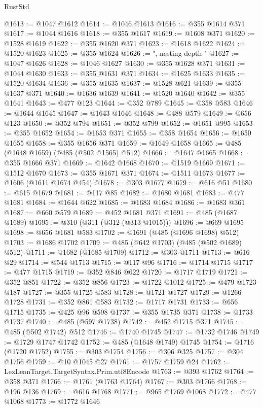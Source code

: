 \begin{lexlean}{RustStd}
\begin{coremodule}
@1613 := @1047 @1612
@1614 := @1046 @1613
@1616 := @355 @1614 @371
@1617 := @1044 @1616
@1618 := @355 @1617
@1619 := @1608 @371
@1620 := @1528 @1619
@1622 := @355 @1620 @371
@1623 := @1618 @1622
@1624 := @1520 @1623
@1625 := @355 @1624
@1626 := ", nesting depth "
@1627 := @1047 @1626
@1628 := @1046 @1627
@1630 := @355 @1628 @371
@1631 := @1044 @1630
@1633 := @355 @1631 @371
@1634 := @1625 @1633
@1635 := @1520 @1634
@1636 := @355 @1635
@1637 := @1528 @621
@1639 := @355 @1637 @371
@1640 := @1636 @1639
@1641 := @1520 @1640
@1642 := @355 @1641
@1643 := @477 @123
@1644 := @352 @789
@1645 := @358 @583
@1646 := @1644 @1645
@1647 := @1643 @1646
@1648 := @488 @579
@1649 := @656 @123
@1650 := @352 @794
@1651 := @352 @799
@1652 := @1651 @995
@1653 := @355 @1652
@1654 := @1653 @371
@1655 := @358 @1654
@1656 := @1650 @1655
@1658 := @355 @1656 @371
@1659 := @1649 @1658
@1665 := @485 (@1648 @1659) (@485 (@502 @1565) @512)
@1666 := @1647 @1665
@1668 := @355 @1666 @371
@1669 := @1642 @1668
@1670 := @1519 @1669
@1671 := @1512 @1670
@1673 := @355 @1671 @371
@1674 := @1511 @1673
@1677 := @1606 (@1611 @1674 @454)
@1678 := @303 @1677
@1679 := @616 @51
@1680 := @615 @1679
@1681 := @117 @85
@1682 := @1680 @1681
@1683 := @477 @1681
@1684 := @1644 @622
@1685 := @1683 @1684
@1686 := @1683 @361
@1687 := @660 @579
@1689 := @452 @1681 @371
@1691 := @485 (@1687 @1689)
@1695 := @310 (@311 (@312 (@313 @1015)))
@1696 := @669 @1695
@1698 := @656 @1681 @583
@1702 := @1691 (@485 (@1696 @1698) @512)
@1703 := @1686 @1702
@1709 := @485 (@642 @1703) (@485 (@502 @1689) @512)
@1711 := @1682 (@1685 @1709)
@1712 := @303 @1711
@1713 := @616 @29
@1714 := @544 @1713
@1715 := @117 @96
@1716 := @1714 @1715
@1717 := @477 @1715
@1719 := @352 @846 @622
@1720 := @1717 @1719
@1721 := @352 @851
@1722 := @352 @856
@1723 := @1722 @1012
@1725 := @479 @1723 @187
@1727 := @355 @1725 @583
@1728 := @1721 @1727
@1729 := @1266 @1728
@1731 := @352 @861 @583
@1732 := @1717 @1731
@1733 := @656 @1715
@1735 := @425 @96 @598
@1737 := @355 @1735 @371
@1738 := @1733 @1737
@1740 := @485 (@597 @1738)
@1742 := @452 @1715 @371
@1745 := @485 (@502 @1742) @512
@1746 := @1740 @1745
@1747 := @1732 @1746
@1749 := @1729 @1747 @1742
@1752 := @485 (@1648 @1749) @1745
@1754 := @1716 (@1720 @1752)
@1755 := @303 @1754
@1756 := @306 @325
@1757 := @304 @1756
@1759 := @10 @1045 @27
@1761 := @1757 @1759 @24
@1762 := LexLeanTarget.TargetSyntax.Prim.utf8Encode
@1763 := @393 @1762
@1764 := @358 @371
@1766 := @1761 (@1763 @1764)
@1767 := @303 @1766
@1768 := @196 @136
@1769 := @616 @1768
@1771 := @965 @1769 @1068
@1772 := @477 @1068
@1773 := @1772 @1646

\end{coremodule}
\end{lexlean}
